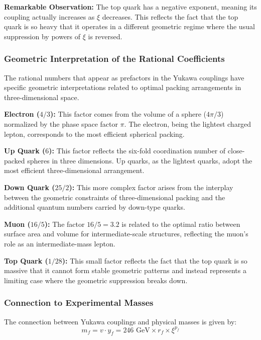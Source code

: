\documentclass[12pt,a4paper]{article}
\newcommand{\xigeom}{\xi}
\begin{document}
	\textbf{Remarkable Observation:} The top quark has a negative exponent, meaning its coupling actually increases as $\xigeom$ decreases. This reflects the fact that the top quark is so heavy that it operates in a different geometric regime where the usual suppression by powers of $\xigeom$ is reversed.
	
	\subsubsection{Geometric Interpretation of the Rational Coefficients}
	
	The rational numbers that appear as prefactors in the Yukawa couplings have specific geometric interpretations related to optimal packing arrangements in three-dimensional space.
	
	\textbf{Electron ($4/3$):} This factor comes from the volume of a sphere ($4\pi/3$) normalized by the phase space factor $\pi$. The electron, being the lightest charged lepton, corresponds to the most efficient spherical packing.
	
	\textbf{Up Quark ($6$):} This factor reflects the six-fold coordination number of close-packed spheres in three dimensions. Up quarks, as the lightest quarks, adopt the most efficient three-dimensional arrangement.
	
	\textbf{Down Quark ($25/2$):} This more complex factor arises from the interplay between the geometric constraints of three-dimensional packing and the additional quantum numbers carried by down-type quarks.
	
	\textbf{Muon ($16/5$):} The factor $16/5 = 3.2$ is related to the optimal ratio between surface area and volume for intermediate-scale structures, reflecting the muon's role as an intermediate-mass lepton.
	
	\textbf{Top Quark ($1/28$):} This small factor reflects the fact that the top quark is so massive that it cannot form stable geometric patterns and instead represents a limiting case where the geometric suppression breaks down.
	
	\subsubsection{Connection to Experimental Masses}
	
	The connection between Yukawa couplings and physical masses is given by:
	\begin{equation}
		m_f = v \cdot y_f = 246 \text{ GeV} \times r_f \times \xigeom^{p_f}
	\end{equation}
	
\end{document}
